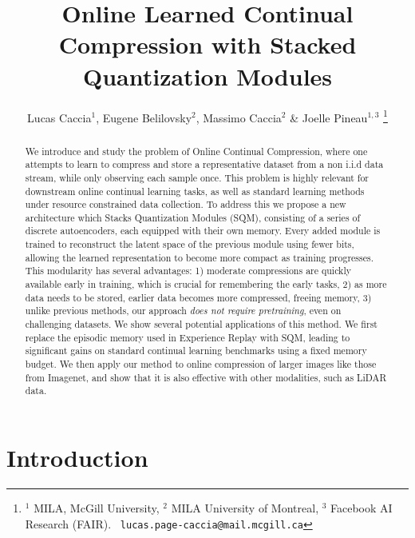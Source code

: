 \documentclass[colorinlistoftodos]{article} %
\title{Online Learned Continual Compression with Stacked Quantization Modules}
\author{Lucas Caccia$^{1}$, Eugene Belilovsky$^{2}$, Massimo Caccia$^{2}$ \& Joelle Pineau$^{1,3}$
\thanks{$^1$ MILA, McGill University, $^2$ MILA University of Montreal, $^3$ Facebook AI Research (FAIR). \texttt{ lucas.page-caccia@mail.mcgill.ca}}}
\begin{document}
\maketitle

\begin{abstract}

We introduce and study the problem of Online Continual Compression, where one attempts to learn to compress and store a representative dataset from a non i.i.d data stream, while only observing each sample once. This problem is highly relevant for downstream online continual learning tasks, as well as standard learning methods under resource constrained data collection. To address this we propose a new architecture which Stacks Quantization Modules (SQM), consisting of a series of discrete autoencoders, each equipped with their own memory. Every added module is trained to reconstruct the latent space of the previous module using fewer bits, allowing the learned representation to become more compact as training progresses. This modularity has several advantages: 1) moderate compressions are quickly available early in training, which is crucial for remembering the early tasks, 2) as more data needs to be stored, earlier data becomes more compressed, freeing memory, 3) unlike previous methods, our approach \textit{does not require pretraining}, even on challenging datasets. We show several potential applications of this method. We first replace the episodic memory used in Experience Replay with SQM, leading to significant gains on standard continual learning benchmarks using a fixed memory budget. We then apply our method to online compression of larger images like those from Imagenet, and show that it is also effective with other modalities, such as LiDAR data.

\end{abstract}


\section{Introduction}
\end{document}
